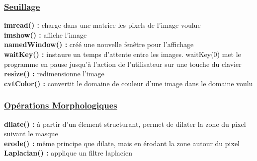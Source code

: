 \documentclass[10pt,a4paper]{report}
\begin{document}
\subsubsection{\underline{Seuillage}}
\textbf{imread() :} charge dans une matrice les pixels de l'image voulue\\
\newline
\textbf{imshow() :} affiche l'image\\
\newline
\textbf{namedWindow() :} créé une nouvelle fenêtre pour l'affichage\\
\newline
\textbf{waitKey() :} instaure un temps d'attente entre les images. waitKey(0) met le programme en pause jusqu'à l'action de l'utilisateur sur une touche du clavier\\
\newline
\textbf{resize() :} redimensionne l'image\\
\newline
\textbf{cvtColor() :} convertit le domaine de couleur d'une image dans le domaine voulu\\
\newline
\subsubsection{\underline{Opérations Morphologiques}}
\textbf{dilate() :} à partir d'un élement structurant, permet de dilater la zone du pixel suivant le masque\\
\newline
\textbf{erode() :} même principe que dilate, mais en érodant la zone autour du pixel\\
\newline
\textbf{Laplacian() :} applique un filtre laplacien\\
\end{document}
